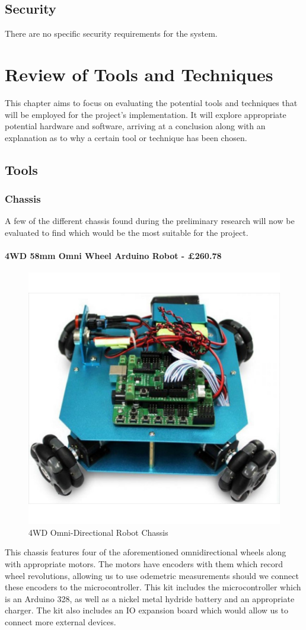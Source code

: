 			\section{Security}
			There are no specific security requirements for the system.
		
		\chapter{Review of Tools and Techniques}
		This chapter aims to focus on evaluating the potential tools and techniques that will be employed for the project's implementation. It will explore appropriate potential hardware and software, arriving at a conclusion along with an explanation as to why a certain tool or technique has been chosen.
			\section{Tools}
				\subsection{Chassis}
					A few of the different chassis found during the preliminary research will now be evaluated to find which would be the most suitable for the project.
					
					\subsubsection{4WD 58mm Omni Wheel Arduino Robot - \pounds{260.78}}
					\begin{figure}[h]
						\centering
						\includegraphics[width=.3\linewidth]{ANALYSIS/4wdomnidirectionalarduino.jpg}
						\caption{4WD Omni-Directional Robot Chassis}
						\label{4WD Omni-Directional Robot Chassis}
					\end{figure}
					This chassis features four of the aforementioned omnidirectional wheels along with appropriate motors. The motors have encoders with them which record wheel revolutions, allowing us to use odemetric measurements should we connect these encoders to the microcontroller. This kit includes the microcontroller which is an Arduino 328, as well as a nickel metal hydride battery and an appropriate charger. The kit also includes an IO expansion board which would allow us to connect more external devices. 
					
